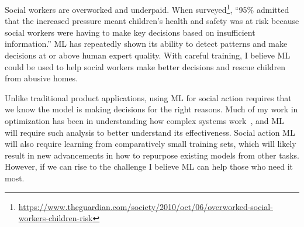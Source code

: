 \documentclass[a4paper, 11pt]{article}
\begin{document}
Social workers are overworked and underpaid. When
surveyed\footnote{\url{https://www.theguardian.com/society/2010/oct/06/overworked-social-workers-children-risk}},
``95\% admitted that the increased pressure meant children's health and safety was at risk because social workers
were having to make key decisions based on insufficient information.'' ML has repeatedly shown
its ability to detect patterns and make decisions at or above human expert quality. With careful
training, I believe ML could be used to help social workers make better decisions and rescue children
from abusive homes.

Unlike traditional product applications, using ML for social action
requires that we know the model is making decisions for the right reasons.
Much of my work in optimization has been in understanding how complex systems work~\cite{goldman:2015:cgpanalysis,goldman:2016:p3hiff},
and ML will require such analysis to better understand its effectiveness.
Social action ML will also require learning
from comparatively small training sets, which will likely result in new advancements
in how to repurpose existing models from other tasks. However, if we can rise to the challenge
I believe ML can help those who need it most.





\small



\end{document}
